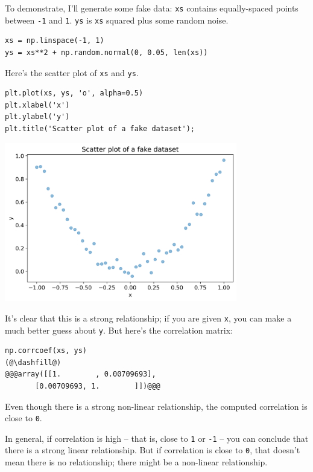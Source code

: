 To demonstrate, I'll generate some fake data:
\passthrough{\lstinline!xs!} contains equally-spaced points between
\passthrough{\lstinline!-1!} and \passthrough{\lstinline!1!}.
\passthrough{\lstinline!ys!} is \passthrough{\lstinline!xs!} squared
plus some random noise.

\begin{lstlisting}[]
xs = np.linspace(-1, 1)
ys = xs**2 + np.random.normal(0, 0.05, len(xs))
\end{lstlisting}

Here's the scatter plot of \passthrough{\lstinline!xs!} and
\passthrough{\lstinline!ys!}.

\begin{lstlisting}[]
plt.plot(xs, ys, 'o', alpha=0.5)
plt.xlabel('x')
plt.ylabel('y')
plt.title('Scatter plot of a fake dataset');
\end{lstlisting}

\begin{center}
\includegraphics[width=4in]{chapters/09_relationships_files/09_relationships_61_0.png}
\end{center}

It's clear that this is a strong relationship; if you are given
\passthrough{\lstinline!x!}, you can make a much better guess about
\passthrough{\lstinline!y!}. But here's the correlation matrix:

\begin{lstlisting}[]
np.corrcoef(xs, ys)
(@\dashfill@)
@@@array([[1.        , 0.00709693],
       [0.00709693, 1.        ]])@@@
\end{lstlisting}

Even though there is a strong non-linear relationship, the computed
correlation is close to \passthrough{\lstinline!0!}.

In general, if correlation is high -- that is, close to
\passthrough{\lstinline!1!} or \passthrough{\lstinline!-1!} -- you can
conclude that there is a strong linear relationship. But if correlation
is close to \passthrough{\lstinline!0!}, that doesn't mean there is no
relationship; there might be a non-linear relationship.

